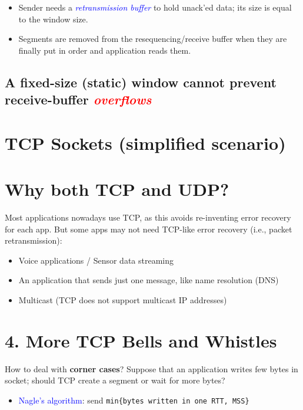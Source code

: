 \documentclass[11pt]{article}
\begin{document}
\begin{itemize}
	\item Sender needs a \textcolor{blue}{\textit{retransmission buffer}} to hold unack'ed data; its size is equal to the window size. 
	\item Segments are removed from the resequencing/receive buffer when they are finally put in order and application reads them. 
\end{itemize}

\subsection*{A fixed-size (static) window cannot prevent receive-buffer \textcolor{red}{\textit{overflows}}}


\section*{TCP Sockets (simplified scenario)}

\section*{Why both TCP and UDP?}

Most applications nowadays use TCP, as this avoids re-inventing error recovery for each app. But some apps may not need TCP-like error recovery (i.e., packet retransmission): 
\begin{itemize}
	\item Voice applications / Sensor data streaming \\
	\textcolor{blue}{}
	\item An application that sends just one message, like name resolution (DNS)
	\item Multicast (TCP does not support multicast IP addresses)
\end{itemize}

\section*{4. More TCP Bells and Whistles}

How to deal with \textbf{corner cases}? Suppose that an application writes few bytes in socket; should TCP create a segment or wait for more bytes? 
\begin{itemize}
	\item \textcolor{blue}{Nagle's algorithm}: send \verb|min{bytes written in one RTT, MSS}|
\end{itemize}
\end{document}
